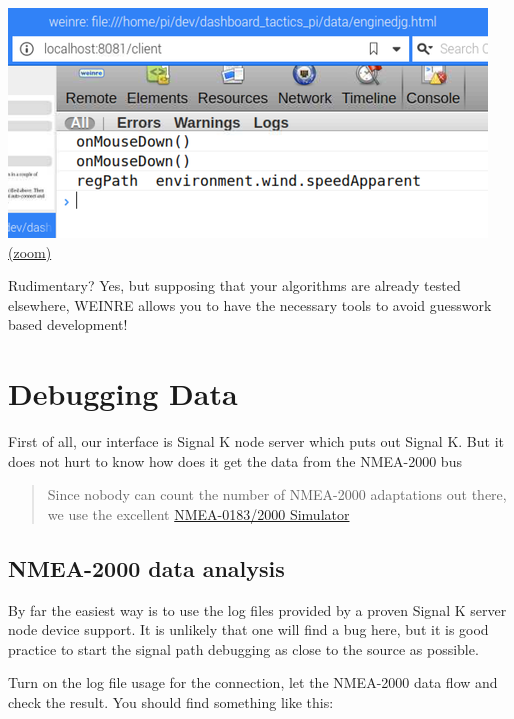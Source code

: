 \documentclass[11pt]{article}
\begin{document}
    \includegraphics{2019-12-25_weinre_server_console_mouse_event_log.png}
\href{img/2019-12-25_weinre_server_console_mouse_event_log.png}{(zoom)}

    Rudimentary? Yes, but supposing that your algorithms are already tested
elsewhere, WEINRE allows you to have the necessary tools to avoid
guesswork based development!

    \hypertarget{debugging-data}{%
\section{Debugging Data}\label{debugging-data}}

    First of all, our interface is Signal K node server which puts out
Signal K. But it does not hurt to know how does it get the data from the
NMEA-2000 bus

    \begin{quote}
Since nobody can count the number of NMEA-2000 adaptations out there, we
use the excellent
\href{https://opencpn.org/wiki/dokuwiki/doku.php?id=opencpn:supplementary_software:signalk:a6\#how_to_use_a_nmea-simulator_to_stream_nmea-0183_and_nmea-2000_data}{NMEA-0183/2000
Simulator}
\end{quote}

    \hypertarget{nmea-2000-data-analysis}{%
\subsection{NMEA-2000 data analysis}\label{nmea-2000-data-analysis}}

    By far the easiest way is to use the log files provided by a proven
Signal K server node device support. It is unlikely that one will find a
bug here, but it is good practice to start the signal path debugging as
close to the source as possible.

    Turn on the log file usage for the connection, let the NMEA-2000 data
flow and check the result. You should find something like this:
\end{document}

